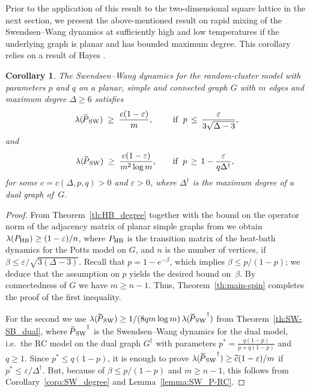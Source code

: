 \documentclass{dis}
\newtheorem{corollary}[theorem]{Corollary}
\theoremstyle{citing}
\begin{document}
Prior to the application of this result to the 
two-dimensional square lattice in the next section, 
we present the above-mentioned result on 
rapid mixing of the Swendsen--Wang dynamics 
at sufficiently high and low temperatures if the underlying 
graph is planar and has bounded maximum degree.
This corollary relies on a result of Hayes \cite{Ha}. 

\vspace{1mm}

\begin{corollary} \label{coro:SW-planar}
The Swendsen--Wang dynamics for the random-cluster model
with parameters $p$ and $q$
on a planar, simple and connected graph $G$ with $m$ edges 
and maximum degree ${\Delta}\ge6$ satisfies
\[
\lambda({{\raisebox{2pt}{ ${\widetilde{{}}}$ }\mkern-14mu P}_{\rm SW}})\;\ge\;\frac{c(1-{\varepsilon})}{m}, \qquad \text{ if }\; 
p \,\le\, \frac{\varepsilon}{3\sqrt{{\Delta}-3}},
\vspace{-1mm}
\] 
and \vspace{-2mm}
\[
\hspace{2mm}
\lambda({{\raisebox{2pt}{ ${\widetilde{{}}}$ }\mkern-14mu P}_{\rm SW}})\;\ge\;\frac{c(1-{\varepsilon})}{m^2 \log m}, \quad\;\;
\text{ if }\; 
p \,\ge\, 1- \frac{\varepsilon}{q {\Delta}^\dag}, \;\;\;\,
\] 
for some $c=c({\Delta},p,q)>0$ and ${\varepsilon}>0$, 
where ${\Delta}^\dag$ is the maximum degree of a dual graph of~$G$.
\end{corollary}

\begin{proof}
From Theorem~\ref{th:HB_degree} together with the bound on the 
operator norm of the adjacency matrix of planar simple graphs 
from \cite[Cor.~17]{Ha} 
we obtain $\lambda({P_{\rm HB}})\ge (1-{\varepsilon})/n$, where ${P_{\rm HB}}$ is the 
transition matrix of the heat-bath dynamics for the Potts model 
on $G$, and $n$ is the number of vertices, 
if $\beta\le{\varepsilon}/\sqrt{3({\Delta}-3)}$.
Recall that $p=1-e^{-\beta}$, which implies $\beta\le p/(1-p)$; 
we deduce that the assumption on $p$ yields the desired bound 
on~$\beta$. By connectedness of $G$ we have $m\ge n-1$. Thus,  
Theorem~\ref{th:main-spin} completes the proof 
of the first inequality.

For the second we use 
$\lambda({{\raisebox{2pt}{ ${\widetilde{{}}}$ }\mkern-14mu P}_{\rm SW}})\ge 1/(8q m \log m)\, \lambda({{\raisebox{2pt}{ ${\widetilde{{}}}$ }\mkern-14mu P}_{\rm SW}}^\dag)$ from 
Theorem~\ref{th:SW-SB_dual}, where 
${{\raisebox{2pt}{ ${\widetilde{{}}}$ }\mkern-14mu P}_{\rm SW}}^\dag$ is the Swendsen--Wang dynamics for the 
dual model, i.e.~the RC model on the dual graph $G^\dag$ with 
parameters $p^*=\frac{q(1-p)}{p+q(1-p)}$ and $q\ge1$. 
Since $p^*\le q(1-p)$, 
it is enough to prove $\lambda({{\raisebox{2pt}{ ${\widetilde{{}}}$ }\mkern-14mu P}_{\rm SW}}^\dag)\ge{\widetilde{{c}}}(1-{\varepsilon})/m$ 
if $p^*\le{\varepsilon}/{\Delta}^\dag$. 
But, because of $\beta\le p/(1-p)$ and $m\ge n-1$, this follows from 
Corollary~\ref{coro:SW_degree} and Lemma~\ref{lemma:SW_P-RC}.
\end{proof}
\vspace{1mm}
\end{document}
